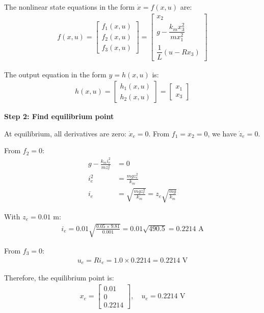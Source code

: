 \documentclass[11pt,a4paper]{article}
\begin{document}
The nonlinear state equations in the form $\dot{x} = f(x,u)$ are:
\begin{align}
f(x,u) = \begin{bmatrix}
f_1(x,u)\\
f_2(x,u)\\
f_3(x,u)
\end{bmatrix} = \begin{bmatrix}
x_2\\[0.3em]
g - \dfrac{k_m x_3^2}{m x_1^2}\\[0.5em]
\dfrac{1}{L}(u - Rx_3)
\end{bmatrix}
\end{align}

The output equation in the form $y = h(x,u)$ is:
\begin{align}
h(x,u) = \begin{bmatrix}
h_1(x,u)\\
h_2(x,u)
\end{bmatrix} = \begin{bmatrix}
x_1\\
x_3
\end{bmatrix}
\end{align}

\textbf{Step 2: Find equilibrium point}

At equilibrium, all derivatives are zero: $\dot{x}_e = 0$. From $f_1 = x_2 = 0$, we have $\dot{z}_e = 0$.

From $f_2 = 0$:
\begin{align}
g - \frac{k_m i_e^2}{m z_e^2} &= 0\\
i_e^2 &= \frac{m g z_e^2}{k_m}\\
i_e &= \sqrt{\frac{m g z_e^2}{k_m}} = z_e\sqrt{\frac{mg}{k_m}}
\end{align}

With $z_e = 0.01$ m:
\begin{align}
i_e = 0.01\sqrt{\frac{0.05 \times 9.81}{0.001}} = 0.01\sqrt{490.5} = 0.2214 \text{ A}
\end{align}

From $f_3 = 0$:
\begin{align}
u_e = R i_e = 1.0 \times 0.2214 = 0.2214 \text{ V}
\end{align}

Therefore, the equilibrium point is:
\begin{align}
x_e = \begin{bmatrix} 0.01 \\ 0 \\ 0.2214 \end{bmatrix}, \quad u_e = 0.2214 \text{ V}
\end{align}
\end{document}
